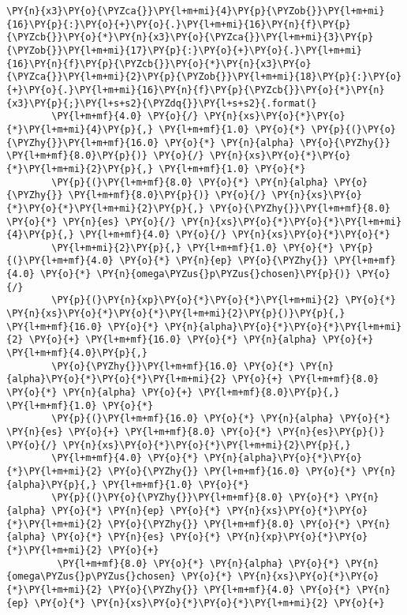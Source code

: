 \begin{Verbatim}[commandchars=\\\{\}]
        \PY{n}{x3}\PY{o}{\PYZca{}}\PY{l+m+mi}{4}\PY{p}{\PYZob{}}\PY{l+m+mi}{16}\PY{p}{:}\PY{o}{+}\PY{o}{.}\PY{l+m+mi}{16}\PY{n}{f}\PY{p}{\PYZcb{}}\PY{o}{*}\PY{n}{x3}\PY{o}{\PYZca{}}\PY{l+m+mi}{3}\PY{p}{\PYZob{}}\PY{l+m+mi}{17}\PY{p}{:}\PY{o}{+}\PY{o}{.}\PY{l+m+mi}{16}\PY{n}{f}\PY{p}{\PYZcb{}}\PY{o}{*}\PY{n}{x3}\PY{o}{\PYZca{}}\PY{l+m+mi}{2}\PY{p}{\PYZob{}}\PY{l+m+mi}{18}\PY{p}{:}\PY{o}{+}\PY{o}{.}\PY{l+m+mi}{16}\PY{n}{f}\PY{p}{\PYZcb{}}\PY{o}{*}\PY{n}{x3}\PY{p}{;}\PY{l+s+s2}{\PYZdq{}}\PY{l+s+s2}{.format(}
        \PY{l+m+mf}{4.0} \PY{o}{/} \PY{n}{xs}\PY{o}{*}\PY{o}{*}\PY{l+m+mi}{4}\PY{p}{,} \PY{l+m+mf}{1.0} \PY{o}{*} \PY{p}{(}\PY{o}{\PYZhy{}}\PY{l+m+mf}{16.0} \PY{o}{*} \PY{n}{alpha} \PY{o}{\PYZhy{}} \PY{l+m+mf}{8.0}\PY{p}{)} \PY{o}{/} \PY{n}{xs}\PY{o}{*}\PY{o}{*}\PY{l+m+mi}{2}\PY{p}{,} \PY{l+m+mf}{1.0} \PY{o}{*}
        \PY{p}{(}\PY{l+m+mf}{8.0} \PY{o}{*} \PY{n}{alpha} \PY{o}{\PYZhy{}} \PY{l+m+mf}{8.0}\PY{p}{)} \PY{o}{/} \PY{n}{xs}\PY{o}{*}\PY{o}{*}\PY{l+m+mi}{2}\PY{p}{,} \PY{o}{\PYZhy{}}\PY{l+m+mf}{8.0} \PY{o}{*} \PY{n}{es} \PY{o}{/} \PY{n}{xs}\PY{o}{*}\PY{o}{*}\PY{l+m+mi}{4}\PY{p}{,} \PY{l+m+mf}{4.0} \PY{o}{/} \PY{n}{xs}\PY{o}{*}\PY{o}{*}
        \PY{l+m+mi}{2}\PY{p}{,} \PY{l+m+mf}{1.0} \PY{o}{*} \PY{p}{(}\PY{l+m+mf}{4.0} \PY{o}{*} \PY{n}{ep} \PY{o}{\PYZhy{}} \PY{l+m+mf}{4.0} \PY{o}{*} \PY{n}{omega\PYZus{}p\PYZus{}chosen}\PY{p}{)} \PY{o}{/}
        \PY{p}{(}\PY{n}{xp}\PY{o}{*}\PY{o}{*}\PY{l+m+mi}{2} \PY{o}{*} \PY{n}{xs}\PY{o}{*}\PY{o}{*}\PY{l+m+mi}{2}\PY{p}{)}\PY{p}{,} \PY{l+m+mf}{16.0} \PY{o}{*} \PY{n}{alpha}\PY{o}{*}\PY{o}{*}\PY{l+m+mi}{2} \PY{o}{+} \PY{l+m+mf}{16.0} \PY{o}{*} \PY{n}{alpha} \PY{o}{+} \PY{l+m+mf}{4.0}\PY{p}{,}
        \PY{o}{\PYZhy{}}\PY{l+m+mf}{16.0} \PY{o}{*} \PY{n}{alpha}\PY{o}{*}\PY{o}{*}\PY{l+m+mi}{2} \PY{o}{+} \PY{l+m+mf}{8.0} \PY{o}{*} \PY{n}{alpha} \PY{o}{+} \PY{l+m+mf}{8.0}\PY{p}{,} \PY{l+m+mf}{1.0} \PY{o}{*}
        \PY{p}{(}\PY{l+m+mf}{16.0} \PY{o}{*} \PY{n}{alpha} \PY{o}{*} \PY{n}{es} \PY{o}{+} \PY{l+m+mf}{8.0} \PY{o}{*} \PY{n}{es}\PY{p}{)} \PY{o}{/} \PY{n}{xs}\PY{o}{*}\PY{o}{*}\PY{l+m+mi}{2}\PY{p}{,}
        \PY{l+m+mf}{4.0} \PY{o}{*} \PY{n}{alpha}\PY{o}{*}\PY{o}{*}\PY{l+m+mi}{2} \PY{o}{\PYZhy{}} \PY{l+m+mf}{16.0} \PY{o}{*} \PY{n}{alpha}\PY{p}{,} \PY{l+m+mf}{1.0} \PY{o}{*}
        \PY{p}{(}\PY{o}{\PYZhy{}}\PY{l+m+mf}{8.0} \PY{o}{*} \PY{n}{alpha} \PY{o}{*} \PY{n}{ep} \PY{o}{*} \PY{n}{xs}\PY{o}{*}\PY{o}{*}\PY{l+m+mi}{2} \PY{o}{\PYZhy{}} \PY{l+m+mf}{8.0} \PY{o}{*} \PY{n}{alpha} \PY{o}{*} \PY{n}{es} \PY{o}{*} \PY{n}{xp}\PY{o}{*}\PY{o}{*}\PY{l+m+mi}{2} \PY{o}{+}
         \PY{l+m+mf}{8.0} \PY{o}{*} \PY{n}{alpha} \PY{o}{*} \PY{n}{omega\PYZus{}p\PYZus{}chosen} \PY{o}{*} \PY{n}{xs}\PY{o}{*}\PY{o}{*}\PY{l+m+mi}{2} \PY{o}{\PYZhy{}} \PY{l+m+mf}{4.0} \PY{o}{*} \PY{n}{ep} \PY{o}{*} \PY{n}{xs}\PY{o}{*}\PY{o}{*}\PY{l+m+mi}{2} \PY{o}{+}

\end{Verbatim}
